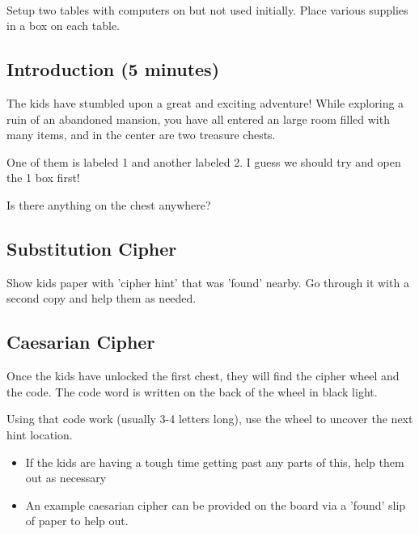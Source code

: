 \documentclass{lessonplan}
\begin{document}
      \paragraph{}
      Setup two tables with computers on but not used initially. 
      Place various supplies in a box on each table.
      \paragraph{}

    \subsection{Introduction (5 minutes)}
      The kids have stumbled upon a great and exciting adventure! 
      While exploring a ruin of an abandoned mansion, 
      you have all entered an large room filled with many items, 
      and in the center are two treasure chests. 

      One of them is labeled 1 and another labeled 2. I guess we should try and open the 1 box first! 
      \par
      Is there anything on the chest anywhere?

    \subsection{Substitution Cipher}
      Show kids paper with 'cipher hint' that was 'found' nearby.
       Go through it with a second copy and help them as needed.

    \subsection{Caesarian Cipher}

      Once the kids have unlocked the first chest, they will find the cipher wheel and the code.
      The code word is written on the back of the wheel in black light.

      Using that code work (usually 3-4 letters long), use the wheel to uncover the next hint location.
      
      \begin{itemize}
        \item If the kids are having a tough time getting past any parts of this, help them out as necessary
        \item An example caesarian cipher can be provided on the board via a 'found' slip of paper to help out.
      \end{itemize}
      
\end{document}
